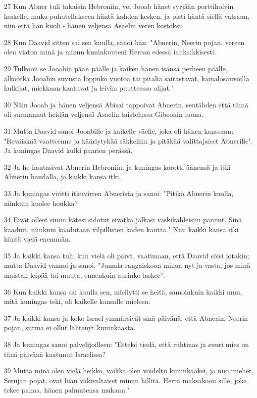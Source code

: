 \par 27 Kun Abner tuli takaisin Hebroniin, vei Jooab hänet syrjään porttiholvin keskelle, muka puhutellakseen häntä kahden kesken, ja pisti häntä siellä vatsaan, niin että hän kuoli - hänen veljensä Asaelin veren kostoksi.
\par 28 Kun Daavid sitten sai sen kuulla, sanoi hän: "Abnerin, Neerin pojan, vereen olen viaton minä ja minun kuninkuuteni Herran edessä iankaikkisesti.
\par 29 Tulkoon se Jooabin pään päälle ja kaiken hänen isänsä perheen päälle, älköötkä Jooabin suvusta loppuko vuotoa tai pitalia sairastavat, kainalosauvoilla kulkijat, miekkaan kaatuvat ja leivän puutteessa olijat."
\par 30 Näin Jooab ja hänen veljensä Abisai tappoivat Abnerin, sentähden että tämä oli surmannut heidän veljensä Asaelin taistelussa Gibeonin luona.
\par 31 Mutta Daavid sanoi Jooabille ja kaikelle väelle, joka oli hänen kanssaan: "Reväiskää vaatteenne ja kääriytykää säkkeihin ja pitäkää valittajaiset Abnerille". Ja kuningas Daavid kulki paarien perässä.
\par 32 Ja he hautasivat Abnerin Hebroniin; ja kuningas korotti äänensä ja itki Abnerin haudalla, ja kaikki kansa itki.
\par 33 Ja kuningas viritti itkuvirren Abnerista ja sanoi: "Pitikö Abnerin kuolla, niinkuin kuolee houkka?
\par 34 Eivät olleet sinun kätesi sidotut eivätkä jalkasi vaskikahleisiin pannut. Sinä kaaduit, niinkuin kaadutaan vilpillisten käden kautta." Niin kaikki kansa itki häntä vielä enemmän.
\par 35 Ja kaikki kansa tuli, kun vielä oli päivä, vaatimaan, että Daavid söisi jotakin; mutta Daavid vannoi ja sanoi: "Jumala rangaiskoon minua nyt ja vasta, jos minä maistan leipää tai muuta, ennenkuin aurinko laskee".
\par 36 Kun kaikki kansa sai kuulla sen, miellytti se heitä, samoinkuin kaikki muu, mitä kuningas teki, oli kaikelle kansalle mieleen.
\par 37 Ja kaikki kansa ja koko Israel ymmärsivät sinä päivänä, että Abnerin, Neerin pojan, surma ei ollut lähtenyt kuninkaasta.
\par 38 Ja kuningas sanoi palvelijoilleen: "Ettekö tiedä, että ruhtinas ja suuri mies on tänä päivänä kaatunut Israelissa?
\par 39 Mutta minä olen vielä heikko, vaikka olen voideltu kuninkaaksi, ja nuo miehet, Serujan pojat, ovat liian väkivaltaiset minun hillitä. Herra maksakoon sille, joka tekee pahaa, hänen pahuutensa mukaan."

